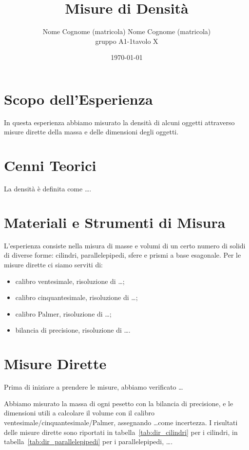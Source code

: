 \documentclass{article}
\title{Misure di Densit\`a}
\author{Nome Cognome (matricola)\quad
        \vspace{3mm}
        Nome Cognome (matricola)\\
         gruppo A1-1\quad tavolo X}
\date{\today}
\begin{document}
\maketitle
\section{Scopo dell'Esperienza}
In questa esperienza abbiamo misurato la densit\`a di alcuni oggetti attraverso misure dirette della massa e delle dimensioni degli oggetti.

\section{Cenni Teorici}
La densit\`a \`e definita come \ldots.

\section{Materiali e Strumenti di Misura}
L'esperienza consiste nella misura di masse e volumi di un certo numero di solidi di diverse forme: cilindri, parallelepipedi, sfere e prismi a base esagonale. Per le misure dirette ci siamo serviti di:
\begin{itemize}
    \item calibro ventesimale, risoluzione di \ldots;
    \item calibro cinquantesimale, risoluzione di \ldots;
    \item calibro Palmer, risoluzione di \ldots;
    \item bilancia di precisione, risoluzione di \ldots.
\end{itemize}

\section{Misure Dirette}
Prima di iniziare a prendere le misure, abbiamo verificato \ldots %

Abbiamo misurato la massa di ogni pesetto con la bilancia di precisione, e le dimensioni utili a calcolare il volume con il calibro ventesimale/cinquantesimale/Palmer, assegnando \ldots come incertezza. I risultati delle misure dirette sono riportati in tabella~\ref{tab:dir_cilindri} per i cilindri, in tabella~\ref{tab:dir_parallelepipedi} per i parallelepipedi, \ldots.
\end{document}
